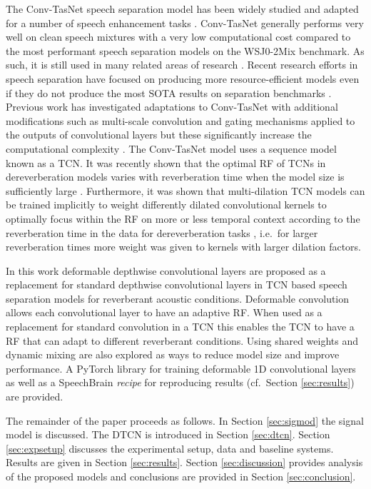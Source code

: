\documentclass{article}
\begin{document}
The Conv-TasNet speech separation model has been widely studied and adapted for a number of speech enhancement tasks \cite{convtasnet, beamtasnet, rfield, speakerbeam2}. 
Conv-TasNet generally performs very well on clean speech mixtures with a very low computational cost compared to the 
most performant speech separation models \cite{sepformer,sudormrf,tinysep} on the WSJ0-2Mix benchmark\cite{Isik}.
As such, it is still used in many related areas of research \cite{beamtasnet,speakerbeam2}. 
Recent research efforts in speech separation have focused on producing more resource-efficient models even if they do not produce the most \ac{SOTA} results on separation benchmarks \cite{sudormrf,tinysep}. 
Previous work has investigated adaptations to Conv-TasNet with additional modifications such as multi-scale convolution and gating mechanisms applied to the outputs of convolutional layers but these significantly increase the computational complexity \cite{furcanext}. 
The Conv-TasNet model uses a sequence model known as a \ac{TCN}. 
It was recently shown that the optimal \ac{RF} of \acp{TCN} in dereverberation models varies with reverberation time when the model size is sufficiently large \cite{rfield}. 
Furthermore, it was shown that multi-dilation \ac{TCN} models can be trained implicitly to weight differently dilated convolutional kernels to optimally focus within the \ac{RF} on more or less temporal context according to the reverberation time in the data for dereverberation tasks \cite{wdtcn}, i.e.~for larger reverberation times more weight was given to kernels with larger dilation factors.

In this work deformable depthwise convolutional layers \cite{deformconv,1ddconv,dsconv} are proposed as a replacement for standard depthwise convolutional layers \cite{convtasnet} in \ac{TCN} based speech separation models for reverberant acoustic conditions. Deformable convolution allows each convolutional layer to have an adaptive \ac{RF}. When used as a replacement for standard convolution in a \ac{TCN} this enables the \ac{TCN} to have a \ac{RF} that can adapt to different reverberant conditions. Using shared weights \cite{furcanext} and dynamic mixing \cite{wavesplit} are also explored as ways to reduce model size and improve performance. A PyTorch library for training deformable 1D convolutional layers as well as a SpeechBrain \cite{speechbrain} \textit{recipe} for reproducing results (cf.~Section \ref{sec:results}) are provided.

The remainder of the paper proceeds as follows. In Section \ref{sec:sigmod} the signal model is discussed. The \ac{DTCN} is introduced in Section \ref{sec:dtcn}. Section \ref{sec:expsetup} discusses the experimental setup, data and baseline systems. Results are given in Section \ref{sec:results}. Section \ref{sec:discussion} provides analysis of the proposed models and conclusions are provided in Section \ref{sec:conclusion}.
\end{document}
